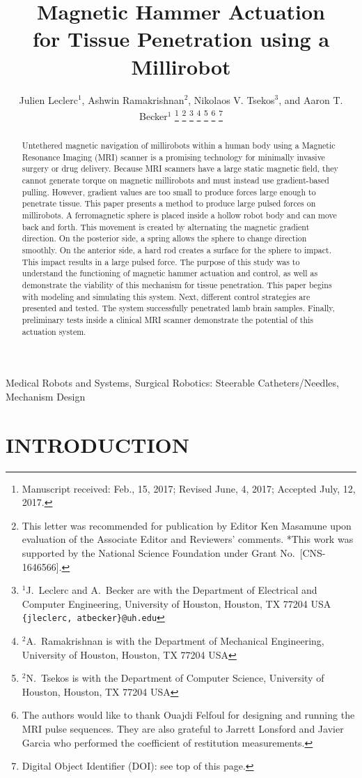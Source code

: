 \documentclass[letterpaper, 10 pt, journal, twoside]{ieeetran}
\title{Magnetic Hammer Actuation\\ for Tissue Penetration using a Millirobot}
\author{Julien Leclerc$^{1}$, Ashwin Ramakrishnan$^{2}$, Nikolaos V. Tsekos$^{3}$, and Aaron T. Becker$^{1}$%
\thanks{Manuscript received: Feb., 15, 2017; Revised June, 4, 2017; Accepted July, 12, 2017.}%
\thanks{This letter was recommended for publication by Editor Ken Masamune upon evaluation of the Associate Editor and Reviewers' comments. *This work was supported by the National Science Foundation under Grant No.\  [CNS-1646566].}%
\thanks{$^{1}$J.~Leclerc and  A.~Becker are with the Department of Electrical and Computer Engineering,  University of Houston, Houston, TX 77204 USA  {\tt\small  \{jleclerc, atbecker\}@uh.edu}}%
\thanks{$^2{}$A.~Ramakrishnan is with the Department of Mechanical Engineering,  University of Houston, Houston, TX 77204 USA}%
\thanks{$^2{}$N.~Tsekos is with the Department of Computer Science,  University of Houston, Houston, TX 77204 USA}%
\thanks{The authors would like to thank Ouajdi Felfoul for designing and running the MRI pulse sequences. They are also grateful to Jarrett Lonsford and Javier Garcia who performed the coefficient of restitution measurements.}%
\thanks{Digital Object Identifier (DOI): see top of this page.}
}
\begin{document}
\maketitle

\begin{abstract}
Untethered magnetic navigation of millirobots within a human body using a Magnetic Resonance Imaging (MRI) scanner is a promising technology for minimally invasive surgery or drug delivery.
Because MRI scanners have a large static magnetic field, they cannot generate torque on magnetic millirobots and must instead use gradient-based pulling.
 However, gradient values are too small to produce forces large enough to penetrate tissue. 
 This paper presents a method to produce large pulsed forces on millirobots. 
 A ferromagnetic sphere is placed inside a hollow robot body and can move back and forth. 
 This movement is created by alternating the magnetic gradient direction. 
 On the posterior side, a spring allows the sphere to change direction smoothly. 
 On the anterior side, a hard rod creates a surface for the sphere to impact. 
 This impact results in a large pulsed force. 
 The purpose of this study was to understand the functioning of magnetic hammer actuation and control, as well as demonstrate the viability of this mechanism for tissue penetration.
 This paper begins with modeling and simulating this system. 
 Next, different control strategies are presented and tested. The system successfully penetrated lamb brain samples.
  Finally, preliminary tests inside a clinical MRI scanner demonstrate the potential of this actuation system. 
\end{abstract}
\begin{IEEEkeywords} %
Medical Robots and Systems, Surgical Robotics: Steerable Catheters/Needles, Mechanism Design
\end{IEEEkeywords}
\section{INTRODUCTION}
\end{document}
